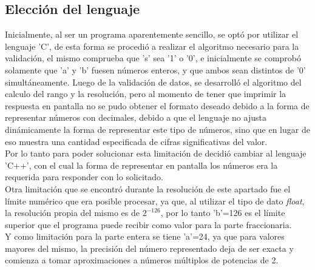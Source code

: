 \subsection{Elecci\'on del lenguaje}
\noindent
Inicialmente, al ser un programa aparentemente sencillo, se opt\'o por utilizar el lenguaje 'C', de esta forma se procedi\'o a realizar el algoritmo necesario para la validaci\'on, el mismo comprueba que 's' sea '1' o '0', e inicialmente se comprob\'o solamente que 'a' y 'b' fuesen n\'umeros enteros, y que ambos sean distintos de '0' simultáneamente. Luego de la validaci\'on de datos, se desarroll\'o el algoritmo del calculo del rango y la resoluci\'on, pero al momento de tener que imprimir la respuesta en pantalla no se pudo obtener el formato deseado debido a la forma de representar n\'umeros con decimales, debido a que el lenguaje no ajusta din\'amicamente la forma de representar este tipo de números, sino que en lugar de eso muestra una cantidad especificada de cifras significativas del valor.\\
Por lo tanto para poder solucionar esta limitaci\'on de decidi\'o cambiar al lenguaje 'C++', con el cual la forma de representar en pantalla los n\'umeros era la requerida para responder con lo solicitado.\\
Otra limitaci\'on que se encontró durante la resolución de este apartado fue el l\'imite num\'erico que era posible procesar, ya que, al utilizar el tipo de dato \textit{float}, la resoluci\'on propia del mismo es de $2^{-126}$, por lo tanto 'b'=126 es el l\'imite superior que el programa puede recibir como valor para la parte fraccionaria.\\
Y como limitación para la parte entera se tiene 'a'=24, ya que para valores mayores del mismo, la precisión del n\'umero representado deja de ser exacta y comienza a tomar aproximaciones a n\'umeros múltiplos de potencias de 2.\\ 